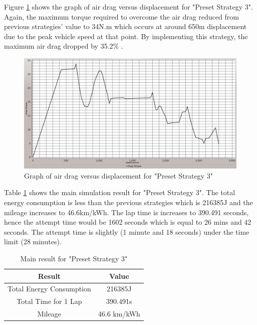 Figure \ref{im:3_3} shows the graph of air drag versus displacement for "Preset Strategy 3". Again, the maximum torque required to overcome the air drag reduced from previous strategies' value to 34N.m which occurs at around 650m displacement due to the peak vehicle speed at that point. By implementing this strategy, the maximum air drag dropped by 35.2\% .

\begin{figure}[htb]
	\centering
	\includegraphics[width=6in]{images/3_3.jpg}
	\caption{Graph of air drag versus displacement for "Preset Strategy 3"}
	\label{im:3_3}
\end{figure}

Table \ref{tb:preset3Result} shows the main simulation result for "Preset Strategy 3". The total energy consumption is less than the previous strategies which is 216385J and the mileage increases to 46.6km/kWh. The lap time is increases to 390.491 seconds, hence the attempt time would be 1602 seconds which is equal to 26 mins and 42 seconds. The attempt time is slightly (1 minute and 18 seconds) under the time limit (28 minutes).

\begin{table}[htbp]
\begin{center}
\begin{tabular}{|c|c|}
\hline
\textbf{Result} & \textbf{Value} \\ \hline
Total Energy Consumption & 216385J \\ \hline
Total Time for 1 Lap & 390.491s \\ \hline
Mileage & 46.6 km/kWh \\ \hline
\end{tabular}
\end{center}
\caption{Main result for "Preset Strategy 3" }
\label{tb:preset3Result}
\end{table} \clearpage

